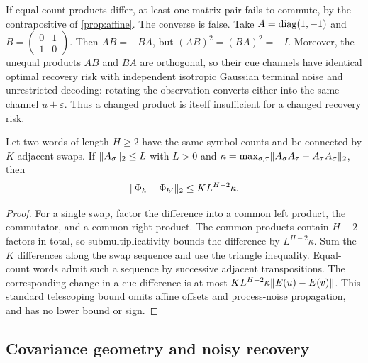 \begin{remark}
\label{prop:noncommuting}
If equal-count products differ, at least one matrix pair fails to commute,
by the contrapositive of \cref{prop:affine}. The converse is false.
Take $A=\operatorname{diag}(1,-1)$ and
$B=\left(\begin{smallmatrix}0&1\\1&0\end{smallmatrix}\right)$.
Then $AB=-BA$, but $(AB)^2=(BA)^2=-I$.
Moreover, the unequal products $AB$ and $BA$ are orthogonal, so their cue
channels have identical optimal recovery risk with independent isotropic Gaussian terminal noise
and unrestricted decoding: rotating the observation converts either into the
same channel $u+\varepsilon$. Thus a changed product is itself insufficient
for a changed recovery risk.
\end{remark}

\begin{lemma}
\label{lem:swaps}
Let two words of length $H\ge2$ have the same symbol counts and be connected
by $K$ adjacent swaps. If $\lVert A_\sigma \rVert_2\le L$ with $L>0$ and
$\kappa=\max_{\sigma,\tau}\lVert A_\sigma A_\tau-A_\tau A_\sigma \rVert_2$, then
\[
 \lVert \Phi_h-\Phi_{h'} \rVert_2\le K L^{H-2}\kappa.
\]
\end{lemma}
\begin{proof}
For a single swap, factor the difference into a common left product, the
commutator, and a common right product. The common products contain $H-2$
factors in total, so submultiplicativity bounds the difference by
$L^{H-2}\kappa$. Sum the $K$ differences along the swap sequence and use the
triangle inequality. Equal-count words admit such a sequence by successive
adjacent transpositions. The corresponding change in a cue difference is at
most $KL^{H-2}\kappa\lVert E(u)-E(v) \rVert$. This standard telescoping bound omits
affine offsets and process-noise propagation, and has no lower bound or sign.
\end{proof}

\subsection{Covariance geometry and noisy recovery}

